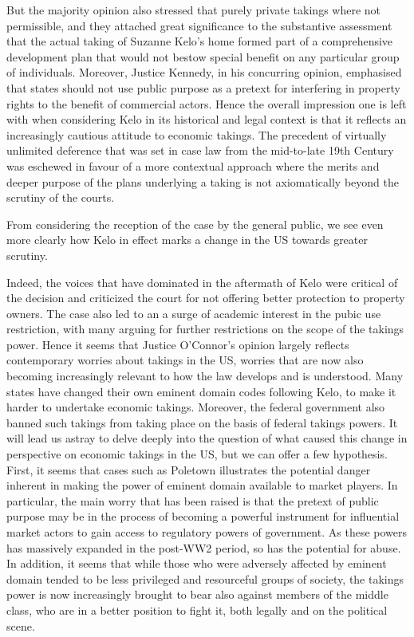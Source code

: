But the majority opinion also stressed that purely private takings where not permissible, and they attached great significance to the substantive assessment that the actual taking of Suzanne Kelo's home formed part of a comprehensive development plan that would not bestow special benefit on any particular group of individuals. Moreover, Justice Kennedy, in his concurring opinion, emphasised that states should not use public purpose as a pretext for interfering in property rights to the benefit of commercial actors.
Hence the overall impression one is left with when considering Kelo in its historical and legal context is that it reflects an increasingly cautious attitude to economic takings. The precedent of virtually unlimited deference that was set in case law from the mid-to-late 19th Century was eschewed in favour of a more contextual approach where the merits and deeper purpose of the plans underlying a taking is not axiomatically beyond the scrutiny of the courts.

From considering the reception of the case by the general public, we see even more clearly how Kelo in effect marks a change in the US towards greater scrutiny. 

Indeed, the voices that have dominated in the aftermath of Kelo were critical of the decision and criticized the court for not offering better protection to property owners. The case also led to an a surge of academic interest in the pubic use restriction, with many arguing for further restrictions on the scope of the takings power. 
Hence it seems that Justice O'Connor's opinion largely reflects contemporary worries about takings in the US, worries that are now also becoming increasingly relevant to how the law develops and is understood. Many states have changed their own eminent domain codes  following Kelo, to make it harder to undertake economic takings. Moreover, the federal government also banned such takings from taking place on the basis of federal takings powers.
It will lead us astray to delve deeply into the question of what caused this change in perspective on economic takings in the US, but we can offer a few hypothesis. First, it seems that cases such as Poletown illustrates the potential danger inherent in making the power of eminent domain available to market players. In particular, the main worry that has been raised is that the pretext of public purpose may be in the process of becoming a powerful instrument for influential market actors to gain access to regulatory powers of government. As these powers has massively expanded in the post-WW2 period, so has the potential for abuse. In addition, it seems that while those who were adversely affected by eminent domain tended to be less privileged and resourceful groups of society, the takings power is now increasingly brought to bear also against members of the middle class, who are in a better position to fight it, both legally and on the political scene.

